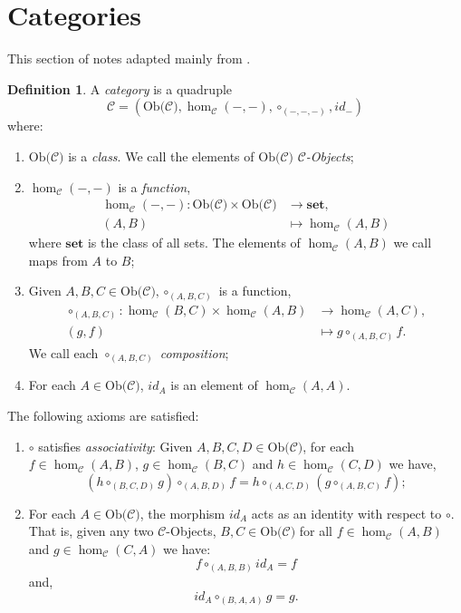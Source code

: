 \documentclass[11pt,a4paper]{article}
\theoremstyle{definition}
\newtheorem{definition}[thm]{Definition}
\newcommand\ho[3][]{\hom_{#1}(#2,#3)}
\newcommand\ob[1]{\mathrm{Ob(}#1\mathrm{)}}
\newcommand\cat[1]{\mathscr{#1}}
\newcommand\objs[1]{#1-Objects}
\numberwithin{equation}{section}
\begin{document}
\section{Categories}
\label{s:cat} 
This section of notes adapted mainly from \cite{Leinster}.
\begin{definition}
\label{def:category}
A \emph{category} is a quadruple \[\mathscr{C} = (\ob{\mathscr{C}}, \ho[\cat{C}]{-}{-}, \circ_{(-,-,-)}, id_{-})\] where:
\begin{enumerate}
    \item $\ob{\mathscr{C}}$ is a \emph{class}. We call the elements of $\ob{\mathscr{C}}$ \emph{\objs{$\mathscr{C}$}};
    \item $\ho[\cat{C}]{-}{-}$ is a \emph{function},
    \begin{align*}
    \ho[\cat{C}]{-}{-} \colon  \ob{\mathscr{C}}\times\ob{\mathscr{C}}&\rightarrow \mathbf{set},\\
    (A,B) &\mapsto \ho[\cat{C}]{A}{B}
    \end{align*}
    where $\mathbf{set}$ is the class of all sets. The  elements of $\ho[\cat{C}]{A}{B}$ we call maps from $A$ to $B$;
    \item Given $A,B,C \in\ob{\mathscr{C}}, \circ_{(A,B,C)}$ is a function,
    \begin{align*}
        \circ_{(A,B,C)}\colon\ho[\cat{C}]{B}{C}\times\ho[\cat{C}]{A}{B}&\rightarrow \ho[\cat{C}]{A}{C},\\
        (g,f)&\mapsto g\circ_{(A,B,C)} f.
    \end{align*}
    We call each $\circ_{(A,B,C)}$ \emph{composition};
    \item For each $A\in\ob{\mathscr{C}}$, $id_{A}$ is an element of $\ho[\cat{C}]{A}{A}$.
\end{enumerate}
The following axioms are satisfied:
\begin{enumerate}
    \item $\circ$ satisfies \emph{associativity}:
    Given $A,B,C,D \in \ob{\mathscr{C}}$, for each $f\in\ho[\cat{C}]{A}{B}$, $g\in\ho[\cat{C}]{B}{C}$ and $h\in\ho[\cat{C}]{C}{D}$ we have, \[(h\circ_{(B,C,D)} g)\circ_{(A,B,D)} f = h\circ_{(A,C,D)} (g\circ_{(A,B,C)} f);\]
    \item For each $A\in\ob{\mathscr{C}}$, the morphism $id_{A}$ acts as an identity with respect to $\circ$. That is, given any two \objs{$\mathscr{C}$}, $B,C\in\ob{\mathscr{C}}$ for all $f\in\ho[\cat{C}]{A}{B}$ and $g\in\ho[\cat{C}]{C}{A}$ we have: \[f\circ_{(A,B,B)} id_{A} = f\]and, \[id_{A}\circ_{(B,A,A)} g = g.\]
    \end{enumerate}
\end{definition}
\end{document}
